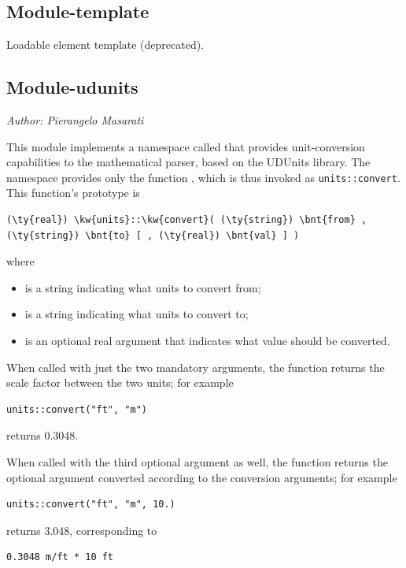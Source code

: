 \subsection{Module-template}
Loadable element template (deprecated).

\subsection{Module-udunits}
\label{sec:modules:udunits}
\emph{Author: Pierangelo Masarati}

\noindent
This module implements a namespace called 
that provides unit-conversion capabilities
to the mathematical parser, based on the UDUnits library.
The namespace provides only the function ,
which is thus invoked as \texttt{units::convert}.
This function's prototype is
\begin{Verbatim}[commandchars=\\\{\}]
    (\ty{real}) \kw{units}::\kw{convert}( (\ty{string}) \bnt{from} , (\ty{string}) \bnt{to} [ , (\ty{real}) \bnt{val} ] )
\end{Verbatim}
where
\begin{itemize}
\item {} is a string indicating what units to convert from;
\item {} is a string indicating what units to convert to;
\item {} is an optional real argument that indicates what value should be converted.
\end{itemize}
When called with just the two mandatory arguments, the function returns the
scale factor between the two units; for example
\begin{Verbatim}[commandchars=\\\{\}]
    units::convert("ft", "m")
\end{Verbatim}
returns 0.3048.

When called with the third optional argument  as well, the function returns
the optional argument  converted according to the conversion arguments;
for example
\begin{Verbatim}[commandchars=\\\{\}]
    units::convert("ft", "m", 10.)
\end{Verbatim}
returns 3.048, corresponding to
\begin{Verbatim}[commandchars=\\\{\}]
    0.3048 m/ft * 10 ft
\end{Verbatim}

